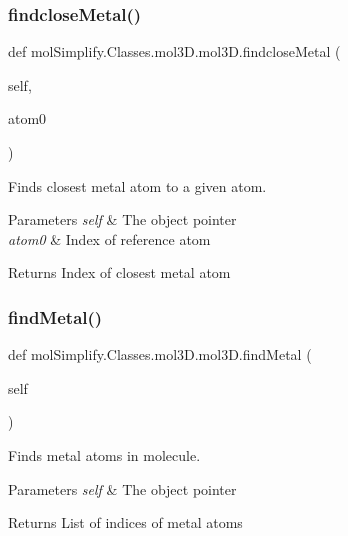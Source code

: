 \subsubsection{\texorpdfstring{findclose\+Metal()}{findcloseMetal()}}
{\footnotesize\ttfamily def mol\+Simplify.\+Classes.\+mol3\+D.\+mol3\+D.\+findclose\+Metal (\begin{DoxyParamCaption}\item[{}]{self,  }\item[{}]{atom0 }\end{DoxyParamCaption})}



Finds closest metal atom to a given atom. 


\begin{DoxyParams}{Parameters}
{\em self} & The object pointer \\
\hline
{\em atom0} & Index of reference atom \\
\hline
\end{DoxyParams}
\begin{DoxyReturn}{Returns}
Index of closest metal atom 
\end{DoxyReturn}
\mbox{\label{classmolSimplify_1_1Classes_1_1mol3D_1_1mol3D_aff49b31bdc2ef9d33a3b67642b6f70d2}} 
\subsubsection{\texorpdfstring{find\+Metal()}{findMetal()}}
{\footnotesize\ttfamily def mol\+Simplify.\+Classes.\+mol3\+D.\+mol3\+D.\+find\+Metal (\begin{DoxyParamCaption}\item[{}]{self }\end{DoxyParamCaption})}



Finds metal atoms in molecule. 


\begin{DoxyParams}{Parameters}
{\em self} & The object pointer \\
\hline
\end{DoxyParams}
\begin{DoxyReturn}{Returns}
List of indices of metal atoms 
\end{DoxyReturn}
\mbox{\label{classmolSimplify_1_1Classes_1_1mol3D_1_1mol3D_a0b5cecd561856f3b3a7525ce75bc5282}} 
